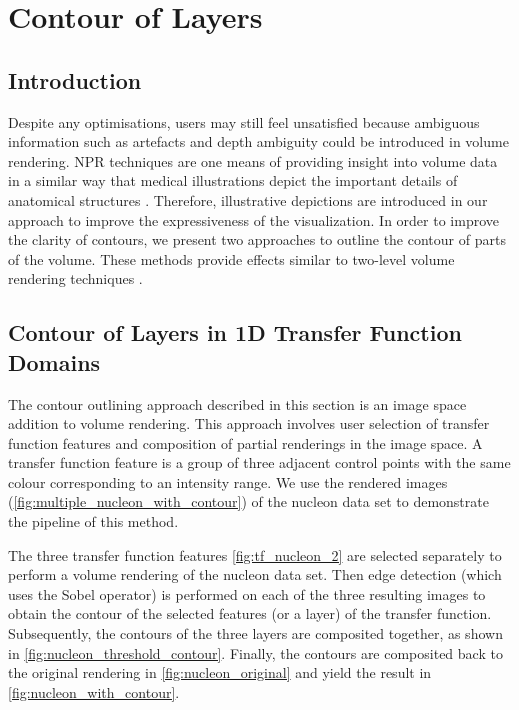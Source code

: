 \chapter{Contour of Layers \label{contour_of_layers}}

\section{Introduction}
Despite any optimisations, users may still feel unsatisfied because ambiguous information such as artefacts and depth ambiguity could be introduced in volume rendering.
NPR techniques are one means of providing insight into volume data in a similar way that medical illustrations depict the important details of anatomical structures \cite{svakhine_illustration-inspired_2009}. 
Therefore, illustrative depictions are introduced in our approach to improve the expressiveness of the visualization. In order to improve the clarity of contours, we present two approaches to outline the contour of parts of the volume. These methods provide effects similar to two-level volume rendering techniques \cite{hauser_two-level_2001} \cite{corcoran_perceptual_2010}.

\section{Contour of Layers in 1D Transfer Function Domains}
The contour outlining approach described in this section is an image space addition to volume rendering. This approach involves user selection of transfer function features and composition of partial renderings in the image space. A transfer function feature is a group of three adjacent control points with the same colour corresponding to an intensity range.
We use the rendered images (\ref{fig:multiple_nucleon_with_contour}) of the nucleon data set to demonstrate the pipeline of this method.

The three transfer function features \ref{fig:tf_nucleon_2} are selected separately to perform a volume rendering of the nucleon data set. Then edge detection (which uses the Sobel operator) is performed on each of the three resulting images to obtain the contour of the selected features (or a layer) of the transfer function. Subsequently, the contours of the three layers are composited together, as shown in \ref{fig:nucleon_threshold_contour}. Finally, the contours are composited back to the original rendering in \ref{fig:nucleon_original} and yield the result in \ref{fig:nucleon_with_contour}.

